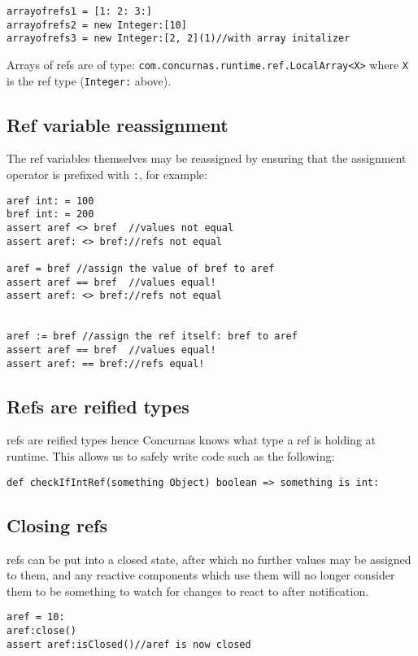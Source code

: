 \documentclass[conc-doc]{subfiles}
\begin{document}
\begin{lstlisting}
arrayofrefs1 = [1: 2: 3:]
arrayofrefs2 = new Integer:[10]
arrayofrefs3 = new Integer:[2, 2](1)//with array initalizer
\end{lstlisting}

Arrays of refs are of type: \lstinline{com.concurnas.runtime.ref.LocalArray<X>} where \lstinline{X} is the ref type (\lstinline{Integer:} above).

\subsection{Ref variable reassignment}
The ref variables themselves may be reassigned by ensuring that the assignment operator is prefixed with \lstinline{:}, for example:

\begin{lstlisting}
aref int: = 100
bref int: = 200
assert aref <> bref  //values not equal
assert aref: <> bref://refs not equal

aref = bref //assign the value of bref to aref
assert aref == bref  //values equal!
assert aref: <> bref://refs not equal


aref := bref //assign the ref itself: bref to aref
assert aref == bref  //values equal!
assert aref: == bref://refs equal!
\end{lstlisting}

\subsection{Refs are reified types}
refs are reified types hence Concurnas knows what type a ref is holding at runtime. This allows us to safely write code such as the following:

\begin{lstlisting}
def checkIfIntRef(something Object) boolean => something is int:
\end{lstlisting}

\subsection{Closing refs}
refs can be put into a closed state, after which no further values may be assigned to them, and any reactive components which use them will no longer consider them to be something to watch for changes to react to after notification.

\begin{lstlisting}
aref = 10:
aref:close()
assert aref:isClosed()//aref is now closed
\end{lstlisting}
\end{document}
